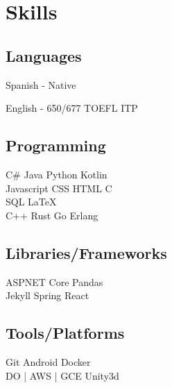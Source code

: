 \documentclass[]{plushcv}
\begin{document}
\hfill
\begin{minipage}[t]{0.25\textwidth}


    \section{Skills}
    \subsection*{Languages}
    \vspace{\topsep} %
    \begin{tightemize}
        \sectionsep
        \item Spanish - Native
        \item English - 650/677 TOEFL ITP
    \end{tightemize}

    \subsection{Programming}
    \sectionsep
    C\# \textbullet{} Java \textbullet{} Python \textbullet{} Kotlin \\
    \sectionsep
    Javascript \textbullet{} CSS \textbullet{} HTML \textbullet{} C \\
    SQL \textbullet{} \LaTeX \\
    \sectionsep
    C++ \textbullet{}  Rust \textbullet{} Go \textbullet{} Erlang \\
    \sectionsep
    \sectionsep
    \subsection{Libraries/Frameworks}
    \sectionsep
    ASPNET Core \textbullet{} Pandas \\ Jekyll \textbullet{} Spring \textbullet{} React \\
    \sectionsep
    \sectionsep
    \subsection{Tools/Platforms}
    \sectionsep
    Git \textbullet{} Android \textbullet{} Docker \\ DO | AWS | GCE \textbullet{} Unity3d \\


\end{minipage}
\end{document}
